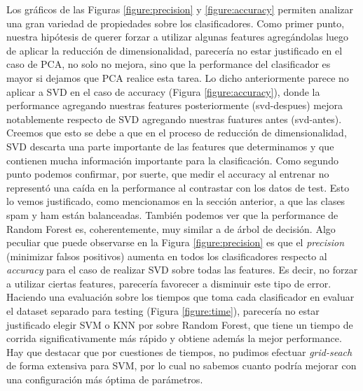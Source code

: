 Los gráficos de las Figuras \ref{figure:precision} y \ref{figure:accuracy} permiten analizar una gran variedad de propiedades sobre los clasificadores. Como primer punto, nuestra hipótesis de querer forzar a utilizar algunas features agregándolas luego de aplicar la reducción de dimensionalidad, parecería no estar justificado en el caso de PCA, no solo no mejora, sino que la performance del clasificador es mayor si dejamos que PCA realice esta tarea. Lo dicho anteriormente parece no aplicar a SVD en el caso de accuracy (Figura \ref{figure:accuracy}), donde la performance agregando nuestras features posteriormente (svd-despues) mejora notablemente respecto de SVD agregando nuestras fuatures antes (svd-antes). Creemos que esto se debe a que en el proceso de reducción de dimensionalidad, SVD descarta una parte importante de las features que determinamos y que contienen mucha información importante para la clasificación.
Como segundo punto podemos confirmar, por suerte, que medir el accuracy al entrenar no representó una caída en la performance al contrastar con los datos de test. Esto lo vemos justificado, como mencionamos en la sección anterior, a que las clases spam y ham están balanceadas.
También podemos ver que la performance de Random Forest es, coherentemente, muy similar a de árbol de decisión.
Algo peculiar que puede observarse en la Figura \ref{figure:precision} es que el \textit{precision} (minimizar falsos positivos) aumenta en todos los clasificadores respecto al \textit{accuracy} para el caso de realizar SVD sobre todas las features. Es decir, no forzar a utilizar ciertas features, parecería favorecer a disminuir este tipo de error.
Haciendo una evaluación sobre los tiempos que toma cada clasificador en evaluar el dataset separado para testing (Figura \ref{figure:time}), parecería no estar justificado elegir SVM o KNN por sobre Random Forest, que tiene un tiempo de corrida significativamente más rápido y obtiene además la mejor performance. Hay que destacar que por cuestiones de tiempos, no pudimos efectuar \textit{grid-seach} de forma extensiva para SVM, por lo cual no sabemos cuanto podría mejorar con una configuración más óptima de parámetros.

